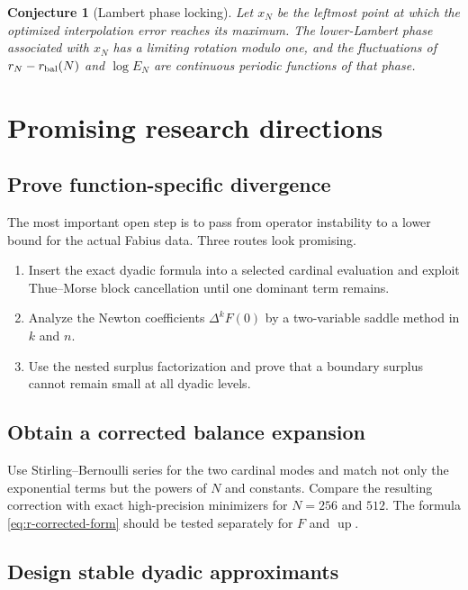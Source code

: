 \documentclass[11pt,oneside]{article}
\newtheorem{conjecture}[theorem]{Conjecture}
\theoremstyle{definition}
\theoremstyle{remark}
\newcommand{\Up}{\operatorname{up}}
\begin{document}
\begin{conjecture}[Lambert phase locking]
\label{conj:phase}
Let $x_N$ be the leftmost point at which the optimized interpolation error reaches its
maximum.  The lower-Lambert phase associated with $x_N$ has a limiting rotation modulo one,
and the fluctuations of
$r_N-r_{\rm bal}(N)$ and $\log E_N$ are continuous periodic functions of that phase.
\end{conjecture}

\section{Promising research directions}
\label{sec:future}

\subsection{Prove function-specific divergence}

The most important open step is to pass from operator instability to a lower bound for the
actual Fabius data.  Three routes look promising.

\begin{enumerate}
\item Insert the exact dyadic formula into a selected cardinal evaluation and exploit
Thue--Morse block cancellation until one dominant term remains.
\item Analyze the Newton coefficients $\Delta^kF(0)$ by a two-variable saddle method in
$k$ and $n$.
\item Use the nested surplus factorization and prove that a boundary surplus cannot remain
small at all dyadic levels.
\end{enumerate}

\subsection{Obtain a corrected balance expansion}

Use Stirling--Bernoulli series for the two cardinal modes and match not only the exponential
terms but the powers of $N$ and constants.  Compare the resulting correction with exact
high-precision minimizers for $N=256$ and $512$.  The formula
\eqref{eq:r-corrected-form} should be tested separately for $F$ and $\Up$.

\subsection{Design stable dyadic approximants}
\end{document}
